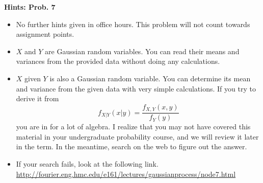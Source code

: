 \documentclass[letterpaper]{article}
\begin{document}
\vspace{1cm}

\noindent \textbf{Hints: Prob. 7}
\begin{itemize}
\item No further hints given in office hours. This problem will not count towards assignment points.
\item  $X$ and $Y$ are Gaussian random variables. You can read their means and variances from the provided data without doing any calculations.
\item $X$ given $Y$ is also a Gaussian random variable. You can determine its mean and variance from the given data with very simple calculations. If you try to derive it from
    $$f_{X|Y}(x|y) = \frac{f_{X,Y}(x,y)}{f_Y(y)}$$
    you are in for a lot of algebra.  I realize that you may not have covered this material in your undergraduate probability course, and we will review it later in the term. In the meantime, search on  the web to figure out the answer.
    \item %
    If your search fails, look at the following link.\\
    \url{http://fourier.eng.hmc.edu/e161/lectures/gaussianprocess/node7.html}
\end{itemize}

\vspace{1cm}
\end{document}
